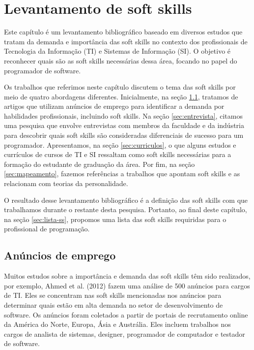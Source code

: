 

\chapter{Levantamento de soft skills}

\label{chap:research}

Este capítulo é um levantamento bibliográfico baseado em diversos estudos que tratam da demanda e importância das soft skills no contexto dos profissionais de Tecnologia da Informação (TI) e Sistemas de Informação (SI). O objetivo é reconhecer quais são as soft skills necessárias dessa área, focando no papel do programador de software.

Os trabalhos que referimos neste capítulo discutem o tema das soft skills por meio de quatro abordagens diferentes. 
Inicialmente, na seção \ref{sec:anuncios}, tratamos de artigos que utilizam anúncios de emprego para identificar a demanda por habilidades profissionais, incluindo soft skills. Na seção \ref{sec:entrevista}, citamos uma pesquisa que envolve entrevistas com membros da faculdade e da indústria para descobrir quais soft skills são consideradas diferenciais de sucesso para um programador. Apresentamos, na seção \ref{sec:curriculos}, o que alguns estudos e currículos de cursos de TI e SI ressaltam como soft skills necessárias para a formação do estudante de graduação da área. Por fim, na seção \ref{sec:mapeamento}, fazemos referências a trabalhos que apontam soft skills e as relacionam com teorias da personalidade.

O resultado desse levantamento bibliográfico é a definição das soft skills com que trabalhamos durante o restante desta pesquisa. Portanto, ao final deste capítulo, na seção \ref{sec:lista-ss}, propomos uma lista das soft skills requiridas para o profissional de programação.

\section{Anúncios de emprego}
\label{sec:anuncios}

Muitos estudos sobre a importância e demanda das soft skills têm sido realizados, por exemplo, Ahmed et al. (2012)\nocite{ahmed:12} fazem uma análise de 500 anúncios para cargos de TI. Eles se concentram nas soft skills mencionadas nos anúncios para determinar quais estão em alta demanda no setor de desenvolvimento de software. Os anúncios foram coletados a partir de portais de recrutamento online da América do Norte, Europa, Ásia e Austrália. Eles incluem trabalhos nos cargos de analista de sistemas, designer, programador de computador e testador de software.

